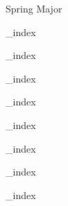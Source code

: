 \documentclass[a4paper,12pt]{article}
\begin{document}


\begin{center}

\huge{Spring Major}

\end{center}



{_index}


{_index}


{_index}


{_index}


{_index}


{_index}


{_index}


{_index}
\end{document}
